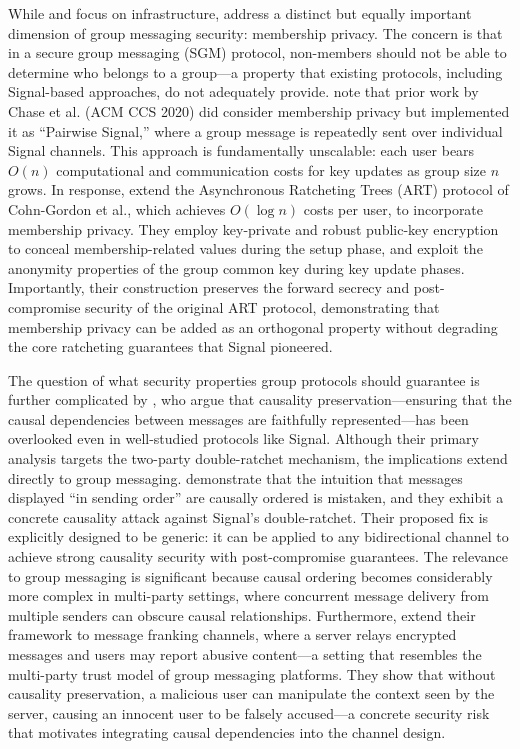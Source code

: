 While \textcite{paillat2024} and \textcite{paillat2025} focus on infrastructure, \textcite{emura2023} address a distinct but equally important dimension of group messaging security: membership privacy. The concern is that in a secure group messaging (SGM) protocol, non-members should not be able to determine who belongs to a group—a property that existing protocols, including Signal-based approaches, do not adequately provide. \textcite{emura2023} note that prior work by Chase et al. (ACM CCS 2020) did consider membership privacy but implemented it as ``Pairwise Signal,'' where a group message is repeatedly sent over individual Signal channels. This approach is fundamentally unscalable: each user bears $O(n)$ computational and communication costs for key updates as group size $n$ grows. In response, \textcite{emura2023} extend the Asynchronous Ratcheting Trees (ART) protocol of Cohn-Gordon et al., which achieves $O(\log n)$ costs per user, to incorporate membership privacy. They employ key-private and robust public-key encryption to conceal membership-related values during the setup phase, and exploit the anonymity properties of the group common key during key update phases. Importantly, their construction preserves the forward secrecy and post-compromise security of the original ART protocol, demonstrating that membership privacy can be added as an orthogonal property without degrading the core ratcheting guarantees that Signal pioneered.

The question of what security properties group protocols should guarantee is further complicated by \textcite{chen2024}, who argue that causality preservation—ensuring that the causal dependencies between messages are faithfully represented—has been overlooked even in well-studied protocols like Signal. Although their primary analysis targets the two-party double-ratchet mechanism, the implications extend directly to group messaging. \textcite{chen2024} demonstrate that the intuition that messages displayed ``in sending order'' are causally ordered is mistaken, and they exhibit a concrete causality attack against Signal's double-ratchet. Their proposed fix is explicitly designed to be generic: it can be applied to any bidirectional channel to achieve strong causality security with post-compromise guarantees. The relevance to group messaging is significant because causal ordering becomes considerably more complex in multi-party settings, where concurrent message delivery from multiple senders can obscure causal relationships. Furthermore, \textcite{chen2024} extend their framework to message franking channels, where a server relays encrypted messages and users may report abusive content—a setting that resembles the multi-party trust model of group messaging platforms. They show that without causality preservation, a malicious user can manipulate the context seen by the server, causing an innocent user to be falsely accused—a concrete security risk that motivates integrating causal dependencies into the channel design.

